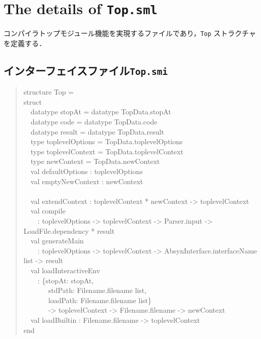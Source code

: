 \documentclass{jbook}
\newcommand{\txt}[2]{#2}
\newcommand{\code}[1]{\mbox{\large\tt #1}}
\newcommand{\myem}{\mbox{\ \ }}
\newenvironment{program}{\begin{quote}\begin{tt}}%
                        {\end{tt}\end{quote}}
\begin{document}
\section{\txt{\code{Top.sml}の処理の詳細}{The details of \code{Top.sml}}}
\ifjp%

	コンパイラトップモジュール機能を実現するファイルであり，\code{Top}
ストラクチャを定義する．

\subsection{インターフェイスファイル\code{Top.smi}}
\begin{program}
structure Top =\\
struct\\
\myem   datatype stopAt = datatype TopData.stopAt\\
\myem   datatype code = datatype TopData.code\\
\myem   datatype result = datatype TopData.result\\
\myem   type toplevelOptions = TopData.toplevelOptions\\
\myem   type toplevelContext = TopData.toplevelContext\\
\myem   type newContext = TopData.newContext\\
\myem   val defaultOptions : toplevelOptions\\
\myem   val emptyNewContext : newContext\\
\\
\myem   val extendContext : toplevelContext * newContext -> toplevelContext\\
\myem   val compile \\
\myem\myem       : toplevelOptions -> toplevelContext -> Parser.input -> LoadFile.dependency * result\\
\myem   val generateMain\\
\myem\myem       : toplevelOptions -> toplevelContext -> AbsynInterface.interfaceName list -> result\\
\myem   val loadInteractiveEnv \\
\myem\myem       : \{stopAt: stopAt,\\
\myem\myem\myem\           stdPath: Filename.filename list,\\
\myem\myem\myem\          loadPath: Filename.filename list\}\\
\myem\myem\myem\          -> toplevelContext -> Filename.filename -> newContext\\
\myem   val loadBuiltin : Filename.filename -> toplevelContext\\
end
\end{program}
\end{document}

